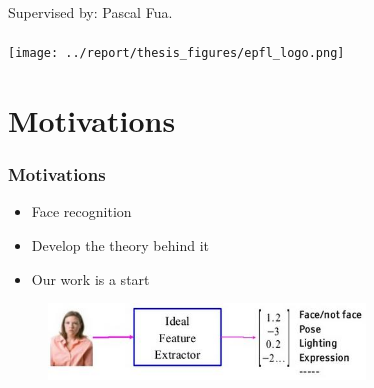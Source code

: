 \documentclass[10pt]{beamer}
\author{\docauthor}
\title{\doctitle}
\begin{document}
\begin{frame}
    \titlepage
    \begin{center}
        Supervised by: Pascal Fua.
        \\
        \vspace{0.5cm}
        \\
        \texttt{[image: ../report/thesis\_figures/epfl\_logo.png]}
    \end{center}
\end{frame}


\begin{frame}
    \tableofcontents{}
\end{frame}

\section{Motivations}
\begin{frame}
    \frametitle{Motivations}
    \begin{itemize}
        \item Face recognition
        \item Develop the theory behind it
        \item Our work is a start
    \end{itemize}

    \begin{figure}[h]
        \begin{center}
            \includegraphics[width=0.75\textwidth]{figures/lecun_face_reco.jpg}
        \end{center}
    \end{figure}
\end{frame}
\end{document}
